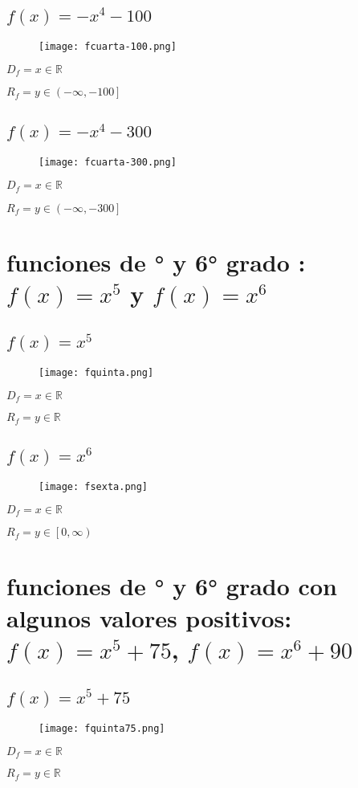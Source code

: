 \documentclass[12pt]{article}
\begin{document}
\subsection{$f(x) = -x^4 - 100$}
\begin{figure}[htb] \centering \texttt{[image: fcuarta-100.png]} 
\end{figure}
$D_f = x \in \mathbb{R}$ \par
$R_f = y \in \left(-\infty,-100\right]$
\subsection{$f(x) = -x^4 - 300$}
\begin{figure}[htb] \centering \texttt{[image: fcuarta-300.png]} 
\end{figure}
$D_f = x \in \mathbb{R}$ \par
$R_f = y \in \left(-\infty,-300\right]$
\newpage
\section{funciones de {° y 6° grado }: $f(x) = x^5$ y $f(x) = x^6$} 
\subsection{$f(x) = x^5$}
\begin{figure}[htb] \centering \texttt{[image: fquinta.png]} 
\end{figure}
$D_f = x \in \mathbb{R}$ \par
$R_f = y \in \mathbb{R}$ 
\subsection{$f(x) = x^6$}
\begin{figure}[htb] \centering \texttt{[image: fsexta.png]} 
\end{figure}
$D_f = x \in \mathbb{R}$ \par
$R_f = y \in \left[0,\infty\right)$ 
\section{funciones de {° y 6° grado }con algunos {\cyan valores positivos}: $f(x) = x^5 + 75$, $f(x) = x^6 + 90$} 
\subsection{$f(x) = x^5 + 75$}
\begin{figure}[htb] \centering \texttt{[image: fquinta75.png]} 
\end{figure}
$D_f = x \in \mathbb{R}$ \par
$R_f = y \in \mathbb{R}$ 
\end{document}

